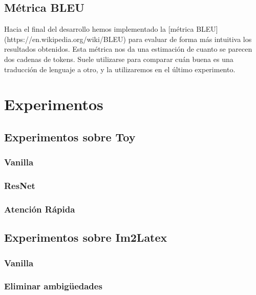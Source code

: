 \documentclass[a4paper, 20pt, dvipsnames]{article}
\begin{document}

\subsection{Métrica BLEU}

Hacia el final del desarrollo hemos implementado la [métrica BLEU](https://en.wikipedia.org/wiki/BLEU) para evaluar de forma más intuitiva los resultados obtenidos. Esta métrica nos da una estimación de cuanto se parecen dos cadenas de tokens. Suele utilizarse para comparar cuán buena es una traducción de lenguaje a otro, y la utilizaremos en el último experimento.



\section{Experimentos}

\subsection{Experimentos sobre Toy}

\subsubsection{Vanilla}
\subsubsection{ResNet}
\subsubsection{Atención Rápida}

\subsection{Experimentos sobre Im2Latex}

\subsubsection{Vanilla}

\subsubsection{Eliminar ambigüedades}
\end{document}
